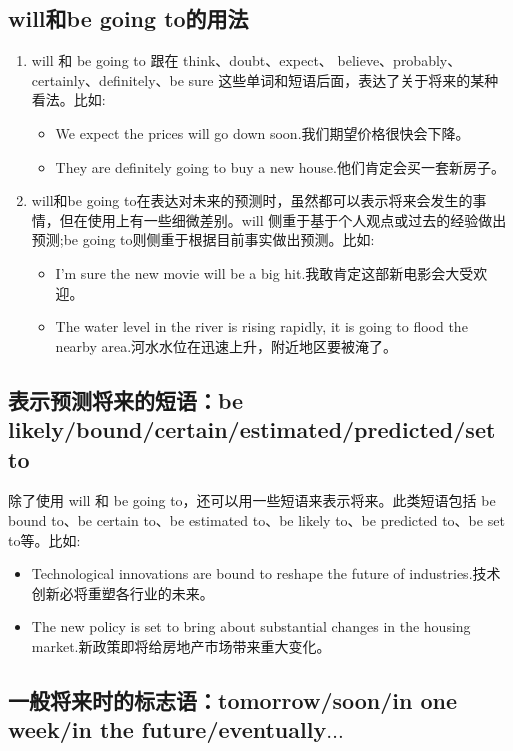 \subsection{will和be going to的用法}

\begin{enumerate}
  \item will 和 be going to 跟在 think、doubt、expect、 believe、probably、 certainly、definitely、be sure 这些单词和短语后面，表达了关于将来的某种看法。比如:
        \begin{itemize}
          \item We expect the prices will go down soon.我们期望价格很快会下降。
          \item They are definitely going to buy a new house.他们肯定会买一套新房子。
        \end{itemize}
  \item will和be going to在表达对未来的预测时，虽然都可以表示将来会发生的事情，但在使用上有一些细微差别。will 侧重于基于个人观点或过去的经验做出预测;be going to则侧重于根据目前事实做出预测。比如:
        \begin{itemize}
          \item I'm sure the new movie will be a big hit.我敢肯定这部新电影会大受欢迎。
          \item The water level in the river is rising rapidly, it is going to flood the nearby area.河水水位在迅速上升，附近地区要被淹了。
        \end{itemize}
\end{enumerate}

\subsection{表示预测将来的短语：be likely/bound/certain/estimated/predicted/set to}

除了使用 will 和 be going to，还可以用一些短语来表示将来。此类短语包括 be bound to、be certain to、be estimated to、be likely to、be predicted to、be set to等。比如:
\begin{itemize}
  \item Technological innovations are bound to reshape the future of industries.技术创新必将重塑各行业的未来。
  \item The new policy is set to bring about substantial changes in the housing market.新政策即将给房地产市场带来重大变化。
\end{itemize}

\subsection{一般将来时的标志语：tomorrow/soon/in one week/in the future/eventually\(\ldots\)}

